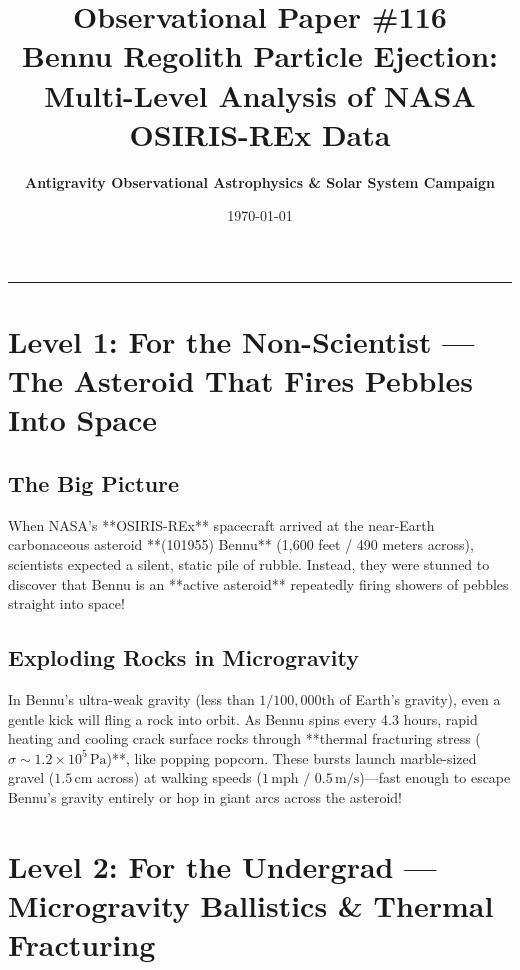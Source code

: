 \documentclass[11pt,a4paper]{article}
\title{\Huge \textbf{Observational Paper \#116}\\ \Large Bennu Regolith Particle Ejection: Multi-Level Analysis of NASA OSIRIS-REx Data}
\author{\textbf{Antigravity Observational Astrophysics \& Solar System Campaign}}
\date{\today}
\begin{document}
\maketitle

\vspace{-1em}
\begin{center}
\rule{\textwidth}{1.5pt}
\end{center}

\section*{Level 1: For the Non-Scientist — The Asteroid That Fires Pebbles Into Space}

\subsection*{The Big Picture}
When NASA's **OSIRIS-REx** spacecraft arrived at the near-Earth carbonaceous asteroid **(101955) Bennu** (1,600 feet / 490 meters across), scientists expected a silent, static pile of rubble. Instead, they were stunned to discover that Bennu is an **active asteroid** repeatedly firing showers of pebbles straight into space!

\subsection*{Exploding Rocks in Microgravity}
In Bennu's ultra-weak gravity (less than $1/100,000\text{th}$ of Earth's gravity), even a gentle kick will fling a rock into orbit. As Bennu spins every 4.3 hours, rapid heating and cooling crack surface rocks through **thermal fracturing stress ($\sigma \sim 1.2 \times 10^5\,\text{Pa}$)**, like popping popcorn. These bursts launch marble-sized gravel ($1.5\,\text{cm}$ across) at walking speeds ($1\,\text{mph / }0.5\,\text{m/s}$)—fast enough to escape Bennu's gravity entirely or hop in giant arcs across the asteroid!

\newpage

\section*{Level 2: For the Undergrad — Microgravity Ballistics \& Thermal Fracturing}
\end{document}

